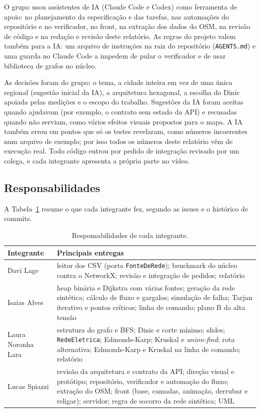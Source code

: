 \documentclass[12pt]{article}
\begin{document}
O grupo usou assistentes de IA (Claude Code e Codex) como ferramenta de apoio: no planejamento da especificação e das tarefas, nas automações do repositório e no verificador, no front, na extração dos dados do OSM, na revisão de código e na redação e revisão deste relatório. As regras do projeto valem também para a IA: um arquivo de instruções na raiz do repositório (\texttt{AGENTS.md}) e uma guarda no Claude Code a impedem de pular o verificador e de usar biblioteca de grafos no núcleo.

As decisões foram do grupo: o tema, a cidade inteira em vez de uma única regional (sugestão inicial da IA), a arquitetura hexagonal, a escolha do Dinic apoiada pelas medições e o escopo do trabalho. Sugestões da IA foram aceitas quando ajudavam (por exemplo, o contrato sem estado da API) e recusadas quando não serviam, como vários efeitos visuais propostos para o mapa. A IA também errou em pontos que só os testes revelaram, como números incoerentes num arquivo de exemplo; por isso todos os números deste relatório vêm de execução real. Todo código entrou por pedido de integração revisado por um colega, e cada integrante apresenta a própria parte no vídeo.

\subsection{Responsabilidades}

A Tabela~\ref{tab:membros} resume o que cada integrante fez, segundo as issues e o histórico de commits.

\begin{table}[ht]
\centering
\caption{Responsabilidades de cada integrante.}
\label{tab:membros}
\begin{tabularx}{\textwidth}{lX}
\toprule
\textbf{Integrante} & \textbf{Principais entregas} \\
\midrule
Davi Lage & leitor dos CSV (porta \texttt{FonteDeRede}); benchmark do núcleo contra o NetworkX; revisão e integração de pedidos; relatório \\
Isaias Alves & heap binária e Dijkstra com várias fontes; geração da rede sintética; cálculo de fluxo e gargalos; simulação de falha; Tarjan iterativo e pontos críticos; linha de comando; plano B da alta tensão \\
Laura Noronha Lara & estrutura do grafo e BFS; Dinic e corte mínimo; slides; \texttt{RedeEletrica}; Edmonds-Karp; Kruskal e \emph{union-find}; rota alternativa; Edmonds-Karp e Kruskal na linha de comando; relatório \\
Lucas Spiazzi & revisão da arquitetura e contrato da API; direção visual e protótipo; repositório, verificador e automação do fluxo; extração do OSM; front (base, camadas, animação, derrubar e religar); servidor; regra de socorro da rede sintética; UML \\
\bottomrule
\end{tabularx}
\end{table}
\end{document}
